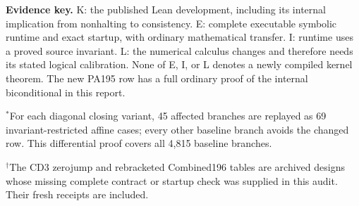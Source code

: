 \textbf{Evidence key.} K: the published Lean development, including its
internal implication from nonhalting to consistency. E: complete executable
symbolic runtime and exact startup, with ordinary mathematical transfer.
I: runtime uses a proved source invariant. L: the numerical calculus changes
and therefore needs its stated logical calibration. None of E, I, or L
denotes a newly compiled kernel theorem. The new PA195 row has a full
ordinary proof of the internal biconditional in this report.

$^{*}$For each diagonal closing variant, 45 affected branches are replayed
as 69 invariant-restricted affine cases; every other baseline branch avoids
the changed row. This differential proof covers all 4,815 baseline branches.

$^{\dagger}$The CD3 zerojump and rebracketed Combined196 tables are archived
designs whose missing complete contract or startup check was supplied in
this audit. Their fresh receipts are included.
